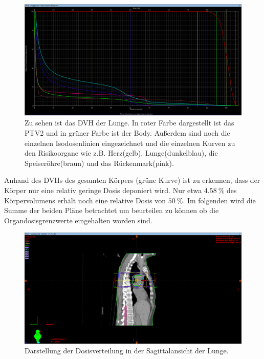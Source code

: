 \begin{figure}[H]
	\centering
	\includegraphics[width=\linewidth]{Bilder/Lunge2_DVH}
	\caption{Zu sehen ist das DVH der Lunge. In roter Farbe dargestellt ist das PTV2 und in grüner Farbe ist der Body. Außerdem sind noch die einzelnen Isodosenlinien eingezeichnet und die einzelnen Kurven zu den Risikoorgane wie z.B. Herz(gelb), Lunge(dunkelblau), die Speiseröhre(braun) und das Rückenmark(pink).}
	\label{fig:lunge2dvh}
\end{figure}

Anhand des DVHs des gesamten Körpers (grüne Kurve) ist zu erkennen, dass der Körper nur eine relativ geringe Dosis deponiert wird. Nur etwa $\SI{4,58}{\percent}$ des Körpervolumens erhält noch eine relative Dosis von $\SI{50}{\percent}$. Im folgenden wird die Summe der beiden Pläne betrachtet um beurteilen zu können ob die Organdosisgrenzwerte eingehalten worden sind.

\begin{figure}[H]
	\centering
	\includegraphics[width=\linewidth]{Bilder/Lunge2_X}
	\caption{Darstellung der Dosisverteilung in der Sagittalansicht der Lunge.}
	\label{fig:lunge2x}
\end{figure}

